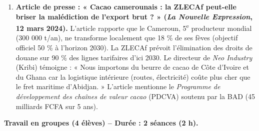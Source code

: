 \documentclass[11pt]{article}
\newcounter{popsec}
\newcounter{popsub}
\newcommand{\courssub}[1]{%
  \stepcounter{popsub}%
  \par\vspace{9pt}\noindent{\popxbold\fontsize{11.5}{13}\selectfont\color{popink}{\color{poporange}\thepopsec.\thepopsub}\hspace{6pt}#1}\par\nopagebreak\vspace{4pt}
}
\begin{document}
\begin{enumerate}
    \item \textbf{Article de presse : « Cacao camerounais : la ZLECAf peut-elle briser la malédiction de l'export brut ? » (\emph{La Nouvelle Expression}, 12 mars 2024).} L'article rapporte que le Cameroun, 5\textsuperscript{e} producteur mondial (300 000 t/an), ne transforme localement que 18 \% de ses fèves (objectif officiel 50 \% à l'horizon 2030). La ZLECAf prévoit l'élimination des droits de douane sur 90 \% des lignes tarifaires d'ici 2030. Le directeur de \emph{Neo Industry} (Kribi) témoigne : « Nous importons du beurre de cacao de Côte d'Ivoire et du Ghana car la logistique intérieure (routes, électricité) coûte plus cher que le fret maritime d'Abidjan. » L'article mentionne le \emph{Programme de développement des chaînes de valeur cacao} (PDCVA) soutenu par la BAD (45 milliards FCFA sur 5 ans).
\end{enumerate}

\courssub{Consignes}
\textbf{Travail en groupes (4 élèves) – Durée : 2 séances (2 h).}
\end{document}
